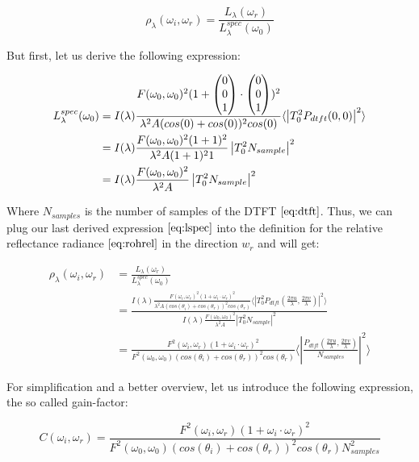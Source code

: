 \begin{equation}
  \rho_\lambda(\omega_i,\omega_r) = \frac{L_\lambda(\omega_r)}{L_\lambda^{spec}(\omega_0)}
  \label{eq:rohrel}
\end{equation}

But first, let us derive the following expression:

\begin{align}
L_\lambda^{spec}(\omega_0) 
& = I(\lambda) \frac{F(\omega_0, \omega_0)^2 (1+\colvec[0]{0}{1}\cdot\colvec[0]{0}{1})^2}{\lambda^2 A (cos(0)+cos(0))^2 cos(0)} \langle \left|T_0^2 P_{dtft}(0,0)  \right|^2\rangle \nonumber \\
& = I(\lambda) \frac{F(\omega_0, \omega_0)^2 (1+1)^2}{\lambda^2 A (1+1)^2 1}\left| T_0^2 N_{sample} \right|^2 \nonumber \\
& = I(\lambda) \frac{F(\omega_0, \omega_0)^2}{\lambda^2 A}\left| T_0^2 N_{sample} \right|^2 
\label{eq:lspec}
\end{align}

Where $N_{samples}$ is the number of samples of the DTFT $\ref{eq:dtft}$. Thus, we can plug our last derived expression $\ref{eq:lspec}$ into the definition for the relative reflectance radiance $\ref{eq:rohrel}$ in the direction $w_r$ and will get:

\begin{align}
\rho_\lambda(\omega_i,\omega_r)
& = \frac{L_\lambda(\omega_r)}{L_\lambda^{spec}(\omega_0)} \nonumber \\
& = \frac{I(\lambda) \frac{F(\omega_i, \omega_r)^2 (1 + \omega_i \cdot \omega_r)^2}{\lambda^2 A (cos(\theta_i)+cos(\theta_r))^2 cos(\theta_r)} \langle \left|T_0^2 P_{dtft}(\frac{2\pi u}{\lambda}, \frac{2\pi v}{\lambda}) \right|^2\rangle}{I(\lambda) \frac{F(\omega_0, \omega_0)^2}{\lambda^2 A}\left| T_0^2 N_{sample} \right|^2 } \nonumber \\
& = \frac{F^2(\omega_i,\omega_r)(1 + \omega_i \cdot \omega_r)^2}{F^2(\omega_0,\omega_0)(cos(\theta_i)+cos(\theta_r))^2 cos(\theta_r)} \langle \left|\frac{P_{dtft}(\frac{2\pi u}{\lambda}, \frac{2\pi v}{\lambda})}{N_{samples}}\right|^2\rangle
\label{eq:lspecrohrel}
\end{align}

For simplification and a better overview, let us introduce the following expression, the so called gain-factor:

\begin{equation} 
    C(\omega_i,\omega_r) = \frac{F^2(\omega_i,\omega_r)(1 + \omega_i \cdot \omega_r)^2}{F^2(\omega_0,\omega_0)(cos(\theta_i)+cos(\theta_r))^2 cos(\theta_r) N_{samples}^2}
\label{eq:cfact}
\end{equation}

